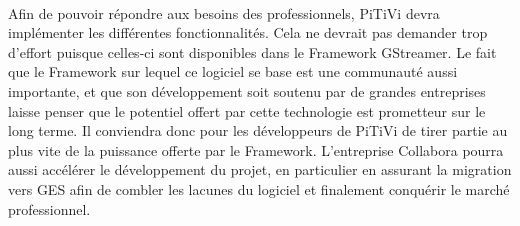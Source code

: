 \paragraph{}

Afin de pouvoir répondre aux besoins des professionnels, PiTiVi devra
implémenter les différentes fonctionnalités. Cela ne devrait pas demander
trop d'effort puisque celles-ci sont disponibles dans le
Framework GStreamer. Le fait que le Framework sur lequel ce logiciel se
base est une communauté aussi importante, et que son développement soit
soutenu par de grandes entreprises laisse penser que le potentiel
offert par cette technologie est prometteur sur le long terme. Il
conviendra donc pour les développeurs de PiTiVi de tirer partie au plus
vite de la puissance offerte par le Framework. L'entreprise Collabora
pourra aussi accélérer le développement du projet, en particulier en
assurant la migration vers GES afin de combler les lacunes du logiciel
et finalement conquérir le marché professionnel.
